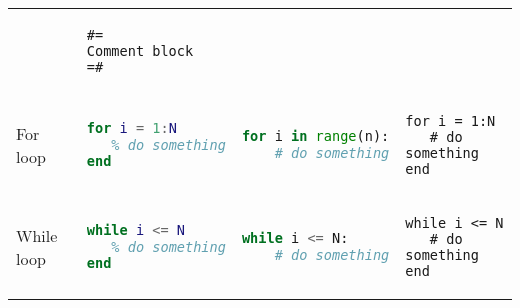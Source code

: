\documentclass[]{article}
\begin{document}
\begin{longtable}[]{@{}llll@{}}
\begin{minipage}[t]{0.22\columnwidth}
\strut
\end{minipage} & \begin{minipage}[t]{0.25\columnwidth}\raggedright\strut
\begin{lstlisting}
#=
Comment block
=#
\end{lstlisting}
\strut
\end{minipage}\tabularnewline
\begin{minipage}[t]{0.19\columnwidth}\raggedright\strut
For loop\strut
\end{minipage} & \begin{minipage}[t]{0.22\columnwidth}\raggedright\strut
\begin{lstlisting}[language=Matlab]
for i = 1:N
   % do something
end
\end{lstlisting}
\strut
\end{minipage} & \begin{minipage}[t]{0.22\columnwidth}\raggedright\strut
\begin{lstlisting}[language=Python]
for i in range(n):
    # do something
\end{lstlisting}
\strut
\end{minipage} & \begin{minipage}[t]{0.25\columnwidth}\raggedright\strut
\begin{lstlisting}
for i = 1:N
   # do something
end
\end{lstlisting}
\strut
\end{minipage}\tabularnewline
\begin{minipage}[t]{0.19\columnwidth}\raggedright\strut
While loop\strut
\end{minipage} & \begin{minipage}[t]{0.22\columnwidth}\raggedright\strut
\begin{lstlisting}[language=Matlab]
while i <= N
   % do something
end
\end{lstlisting}
\strut
\end{minipage} & \begin{minipage}[t]{0.22\columnwidth}\raggedright\strut
\begin{lstlisting}[language=Python]
while i <= N:
    # do something
\end{lstlisting}
\strut
\end{minipage} & \begin{minipage}[t]{0.25\columnwidth}\raggedright\strut
\begin{lstlisting}
while i <= N
   # do something
end
\end{lstlisting}
\strut

\end{minipage}
\end{longtable}
\end{document}
